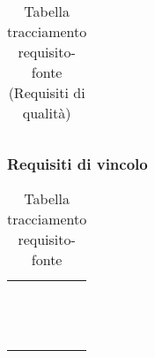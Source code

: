 {{{{{{{\begin{center}
\begin{longtable}{|p{7.5cm}|p{7.5cm}|}
\caption[Tabella tracciamento requisito-fonte]{Tabella tracciamento requisito-fonte (Requisiti di qualità)}\label{4.7}\\
\end{longtable}
\end{center}

\clearpage
\subsubsection{Requisiti di vincolo}\label{RequisitiTracciamentoDeiRequisitiFonteRequisitiDiVincolo}
		
\def\tabularxcolumn#1{m{#1}}
{
	\begin{center}
		\renewcommand{\arraystretch}{1.4}
		\begin{longtable}{|p{7.5cm}|p{7.5cm}|}	
		\hline
		\rowcolor{airforceblue}
		\makecell[tc]{\textbf{Codice RS}} & \makecell[c]{\textbf{Fonte}}  \\
		\makecell[tc]{RSVO1} & \makecell[tc]{Capitolato$_{\scaleto{G}{3pt}}$}\\
		\hline	
		\makecell[tc]{RSVO1.1} & \makecell[tc]{Capitolato$_{\scaleto{G}{3pt}}$}\\
		\hline
		\makecell[tc]{RSVO1.2} & \makecell[tc]{V. esterno 02-02-2021}\\
		\hline
		\makecell[tc]{RSVF2} & \makecell[tc]{V. esterno 02-02-2021}\\
		\hline
		\makecell[tc]{RSVO3} & \makecell[tc]{Capitolato$_{\scaleto{G}{3pt}}$}\\
		\hline
		\makecell[tc]{RSVO4} & \makecell[tc]{Capitolato$_{\scaleto{G}{3pt}}$}\\
		\hline
		\makecell[tc]{RSVO5} & \makecell[tc]{Interno}\\
		\hline
		\makecell[tc]{RSVF6} & \makecell[tc]{Interno}\\
		\hline
		\makecell[tc]{RSVO7} & \makecell[tc]{Capitolato$_{\scaleto{G}{3pt}}$}\\
		\hline
		\makecell[tc]{RSVF8} & \makecell[tc]{V. esterno 02-02-2021}\\
		\hline
		\makecell[tc]{RSVO9} & \makecell[tc]{Interno}\\
		\hline
		\rowcolor{white}

		\caption[Tabella tracciamento requisito-fonte]{Tabella tracciamento requisito-fonte}\label{4.8}\\
	\end{longtable}
\end{center}
\clearpage

}}}}}}}}
